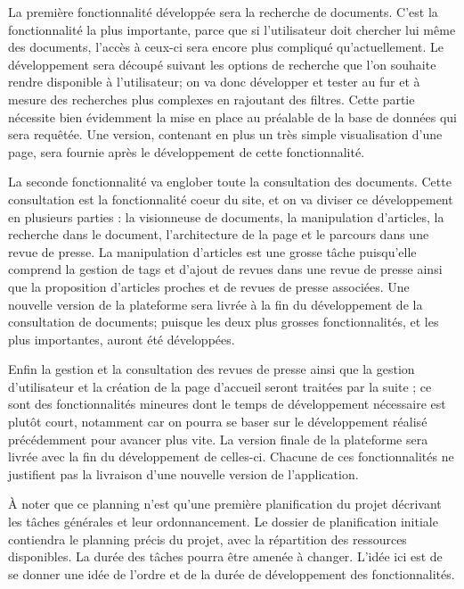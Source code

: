 	La première fonctionnalité développée sera la recherche de documents. C'est la fonctionnalité la plus importante, parce que si l'utilisateur doit chercher lui même des documents, l'accès à ceux-ci sera encore plus compliqué qu'actuellement. Le développement sera découpé suivant les options de recherche que l'on souhaite rendre disponible à l'utilisateur; on va donc développer et tester au fur et à mesure des recherches plus complexes en rajoutant des filtres. Cette partie nécessite bien évidemment la mise en place au préalable de la base de données qui sera requêtée. Une version, contenant en plus un très simple visualisation d'une page, sera fournie après le développement de cette fonctionnalité.

	La seconde fonctionnalité va englober toute la consultation des documents. Cette consultation est la fonctionnalité coeur du site, et on va diviser ce développement en plusieurs parties : la visionneuse de documents, la manipulation d'articles, la recherche dans le document, l'architecture de la page et le parcours dans une revue de presse. La manipulation d'articles est une grosse tâche puisqu'elle comprend la gestion de tags et d'ajout de revues dans une revue de presse ainsi que la proposition d'articles proches et de revues de presse associées. Une nouvelle version de la plateforme sera livrée à la fin du développement de la consultation de documents; puisque les deux plus grosses fonctionnalités, et les plus importantes, auront été développées.

	Enfin la gestion et la consultation des revues de presse ainsi que la gestion d'utilisateur et la création de la page d'accueil seront traitées par la suite ; ce sont des fonctionnalités mineures dont le temps de développement nécessaire est plutôt court, notamment car on pourra se baser sur le développement réalisé précédemment pour avancer plus vite. La version finale de la plateforme sera livrée avec la fin du développement de celles-ci. Chacune de ces fonctionnalités ne justifient pas la livraison d'une nouvelle version de l'application.

	À noter que ce planning n'est qu'une première planification du projet décrivant les tâches générales et leur ordonnancement. Le dossier de planification initiale contiendra le planning précis du projet, avec la répartition des ressources disponibles. La durée des tâches pourra être amenée à changer. L'idée ici est de se donner une idée de l'ordre et de la durée de développement des fonctionnalités.

